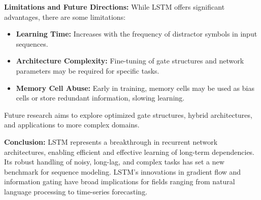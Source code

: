\textbf{Limitations and Future Directions:} While LSTM offers significant advantages, there are some limitations:
\begin{itemize}
    \item \textbf{Learning Time:} Increases with the frequency of distractor symbols in input sequences.
    \item \textbf{Architecture Complexity:} Fine-tuning of gate structures and network parameters may be required for specific tasks.
    \item \textbf{Memory Cell Abuse:} Early in training, memory cells may be used as bias cells or store redundant information, slowing learning.
\end{itemize}
Future research aims to explore optimized gate structures, hybrid architectures, and applications to more complex domains.

\textbf{Conclusion:} LSTM represents a breakthrough in recurrent network architectures, enabling efficient and effective learning of long-term dependencies. Its robust handling of noisy, long-lag, and complex tasks has set a new benchmark for sequence modeling. LSTM's innovations in gradient flow and information gating have broad implications for fields ranging from natural language processing to time-series forecasting.

